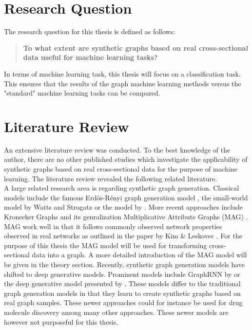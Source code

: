 	\section{Research Question}

	The research question for this thesis is defined as follows:

	\begin{quote}
		\item \textbf{To what extent are synthetic graphs based on real cross-sectional
			data useful for machine learning tasks?}
	\end{quote}

	\noindent In terms of machine learning task, this thesis will focus on a
	classification task. This ensures that the results of the graph machine
	learning methods versus the "standard" machine learning tasks can be
	compared.

	\section{Literature Review}

	An extensive literature review was conducted. To the best knowledge of the
	author, there are no other published studies which investigate the
	applicability of synthetic graphs based on real cross-sectional data for
	the purpose of machine learning. The literature review revealed the
	following related literature.
	\\

	\noindent A large related research area is regarding synthetic 
	graph generation. Classical models include the famous Erdös-Rényi graph
	generation model \citep{erdos2011evolution}, the small-world model by
	Watts and Strogatz \citeyearpar{watts1998collective} or the model by
	\cite{barabasi1999emergence}. More recent approaches include Kronecker Graphs 
	\citep{leskovec2010kronecker} and its genralization 
	Multiplicative Attribute Graphs (MAG) \citep{kim2012multiplicative}. 
	MAG work well in that it follows commonly observed network properties observed 
	in real networks as outlined in the paper by Kim \& Leskovec
	\citeyearpar{kim2012multiplicative}. 
	For the purpose of this thesis the MAG model will be used for transforming 
	cross-sectional data into a graph. A more detailed introduction of the MAG 
	model will be given in the theory section. Recently, synthetic graph generation 
	models have shifted to deep generative models. Prominent models include 
	GraphRNN by \cite{you2018graphrnn} or the deep generative model presented
	by \cite{li2018learning}. These models differ to the traditional graph
	generation models in that they learn to create synthetic graphs based on
	real graph samples. These newer approaches could for instance be used for
	drug molecule discovery among many other approaches. These newer models are
	however not purposeful for this thesis. 
